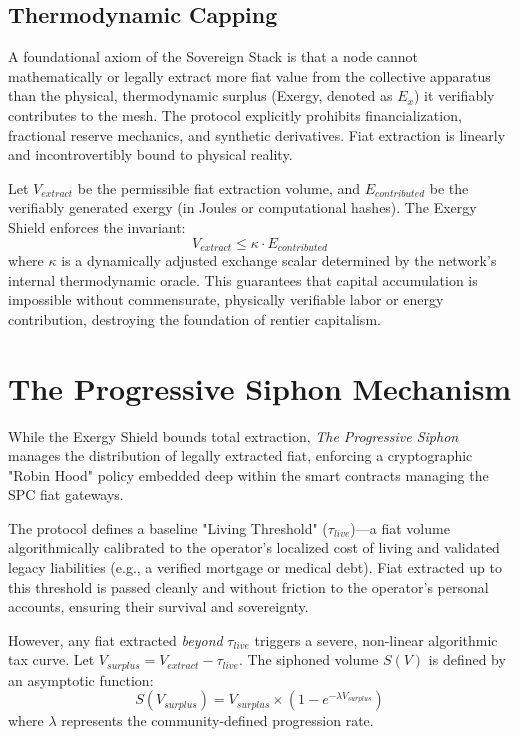 \subsection{Thermodynamic Capping}
A foundational axiom of the Sovereign Stack is that a node cannot mathematically or legally extract more fiat value from the collective apparatus than the physical, thermodynamic surplus (Exergy, denoted as $E_x$) it verifiably contributes to the mesh. The protocol explicitly prohibits financialization, fractional reserve mechanics, and synthetic derivatives. Fiat extraction is linearly and incontrovertibly bound to physical reality. 

Let $V_{extract}$ be the permissible fiat extraction volume, and $E_{contributed}$ be the verifiably generated exergy (in Joules or computational hashes). The Exergy Shield enforces the invariant:
\begin{equation}
    V_{extract} \leq \kappa \cdot E_{contributed}
\end{equation}
where $\kappa$ is a dynamically adjusted exchange scalar determined by the network's internal thermodynamic oracle. This guarantees that capital accumulation is impossible without commensurate, physically verifiable labor or energy contribution, destroying the foundation of rentier capitalism.

\section{The Progressive Siphon Mechanism}
While the Exergy Shield bounds total extraction, \textit{The Progressive Siphon} manages the distribution of legally extracted fiat, enforcing a cryptographic "Robin Hood" policy embedded deep within the smart contracts managing the SPC fiat gateways. 

The protocol defines a baseline "Living Threshold" ($\tau_{live}$)—a fiat volume algorithmically calibrated to the operator's localized cost of living and validated legacy liabilities (e.g., a verified mortgage or medical debt). Fiat extracted up to this threshold is passed cleanly and without friction to the operator's personal accounts, ensuring their survival and sovereignty.

However, any fiat extracted \textit{beyond} $\tau_{live}$ triggers a severe, non-linear algorithmic tax curve. Let $V_{surplus} = V_{extract} - \tau_{live}$. The siphoned volume $S(V)$ is defined by an asymptotic function:
\begin{equation}
    S(V_{surplus}) = V_{surplus} \times \left( 1 - e^{-\lambda V_{surplus}} \right)
\end{equation}
where $\lambda$ represents the community-defined progression rate. 

